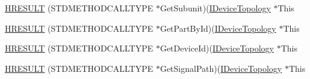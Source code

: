 \begin{DoxyCompactItemize}
\item 
\hyperlink{struct_i_device_topology_vtbl_a56596b816e48f0906b70e844fb89742b}{H\+R\+E\+S\+U\+LT} (S\+T\+D\+M\+E\+T\+H\+O\+D\+C\+A\+L\+L\+T\+Y\+PE $\ast$Get\+Subunit)(\hyperlink{devicetopology_8h_a4997c6c4616c3245d515eafd2ce686d0}{I\+Device\+Topology} $\ast$This
\item 
\hyperlink{struct_i_device_topology_vtbl_ad9b3eb88fb1e828d33accff5def2dd8f}{H\+R\+E\+S\+U\+LT} (S\+T\+D\+M\+E\+T\+H\+O\+D\+C\+A\+L\+L\+T\+Y\+PE $\ast$Get\+Part\+By\+Id)(\hyperlink{devicetopology_8h_a4997c6c4616c3245d515eafd2ce686d0}{I\+Device\+Topology} $\ast$This
\item 
\hyperlink{struct_i_device_topology_vtbl_a4f08490f3e317c73b60470b50dc46b5c}{H\+R\+E\+S\+U\+LT} (S\+T\+D\+M\+E\+T\+H\+O\+D\+C\+A\+L\+L\+T\+Y\+PE $\ast$Get\+Device\+Id)(\hyperlink{devicetopology_8h_a4997c6c4616c3245d515eafd2ce686d0}{I\+Device\+Topology} $\ast$This
\item 
\hyperlink{struct_i_device_topology_vtbl_a20ced4ca40a3b70b001bedc5d56d5594}{H\+R\+E\+S\+U\+LT} (S\+T\+D\+M\+E\+T\+H\+O\+D\+C\+A\+L\+L\+T\+Y\+PE $\ast$Get\+Signal\+Path)(\hyperlink{devicetopology_8h_a4997c6c4616c3245d515eafd2ce686d0}{I\+Device\+Topology} $\ast$This
\end{DoxyCompactItemize}
